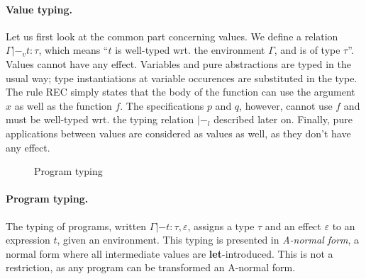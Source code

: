 \documentclass[a4paper]{llncs}
\newcommand{\letml}{{\bf let}}
\newcommand{\inml}{{\bf in}}
\newcommand{\ifml}{{\bf if}}
\newcommand{\thenml}{{\bf then}}
\newcommand{\elseml}{{\bf else}}
\newcommand{\boolml}{{\bf bool}}
\newcommand{\alist}[1]{\overline{#1} }
\begin{document}
\paragraph{Value typing.}
Let us first look at the common part concerning values. We define a relation
$Γ|-_v t : τ$, which means ``$t$ is well-typed wrt. the environment $Γ$, and
is of type $τ$''. Values cannot have any effect.  Variables and pure
abstractions are typed in the usual way; type instantiations at variable
occurences are substituted in the type. The rule {\sc REC} simply states that
the body of the function can use the argument $x$ as well as the function $f$.
The specifications $p$ and $q$, however, cannot use $f$ and must be well-typed
wrt. the typing relation $|-_l$ described later on. Finally, pure applications
between values are considered as values as well, as they don't have any
effect.

\begin{figure}[htpb]
  \caption{Program typing}
  \label{fig:progtyping}
\end{figure}

\paragraph{Program typing.}
The typing of programs, written $Γ|- t : τ,ε$, assigns a type $τ$ and an
effect $ε$ to an expression $t$, given an environment. This typing is
presented in {\em A-normal form}, a normal form where all intermediate values
are \letml-introduced. This is not a restriction, as any program can be
transformed an A-normal form.
\end{document}
